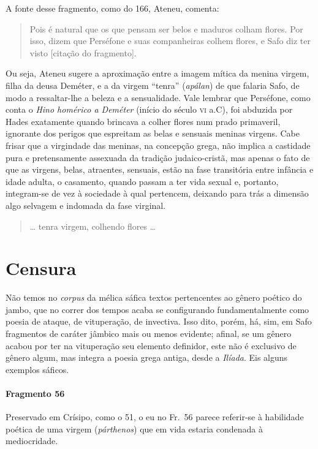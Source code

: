 {\small A fonte desse fragmento, como do 166, Ateneu, comenta: 

\begin{quote}
Pois é natural
que os que pensam ser belos e maduros colham flores. Por isso, dizem que
Perséfone e suas companheiras colhem flores, e Safo diz ter visto 
[citação do fragmento].
\end{quote}

 Ou seja, Ateneu sugere a aproximação entre a imagem
mítica da menina virgem, filha da deusa Deméter, e a da virgem ``tenra”
(\textit{apálan}) de que falaria Safo, de modo a ressaltar-lhe a beleza e a
sensualidade. Vale lembrar que Perséfone, como conta o \textit{Hino homérico a Deméter} 
(início do século \textsc{vi} a.C), foi abduzida por Hades exatamente
quando brincava a colher flores num prado primaveril, ignorante dos perigos que
espreitam as belas e sensuais meninas virgens. Cabe frisar que a virgindade das
meninas, na concepção grega, não implica a castidade pura e pretensamente
assexuada da tradição judaico-cristã, mas apenas o fato de que as virgens,
belas, atraentes, sensuais, estão na fase transitória entre infância e idade
adulta, o casamento, quando passam a ter vida sexual e, portanto, integram-se
de vez à sociedade à qual pertencem, deixando para trás a dimensão algo
selvagem e indomada da fase virginal.}

\begin{verse}
\ldots{} tenra virgem, colhendo flores \ldots{}
\end{verse}


\section{Censura}

Não temos no \textit{corpus }da mélica sáfica textos pertencentes ao gênero
poético do jambo, que no correr dos tempos acaba se configurando fundamentalmente como poesia de
ataque, de vituperação, de invectiva. Isso dito, porém, há, sim, em Safo
fragmentos de caráter jâmbico mais ou menos evidente; afinal, se um gênero
acabou por ter na vituperação seu elemento definidor, este não é exclusivo de
gênero algum, mas integra a poesia grega antiga, desde a \textit{Ilíada}. Eis
alguns exemplos sáficos.

\paragraph{Fragmento 56}

{\small Preservado em Crísipo, como o 51, o eu no Fr.~56 parece referir-se à habilidade
poética de uma virgem (\textit{párthenos}) que em vida estaria condenada à
mediocridade.}

